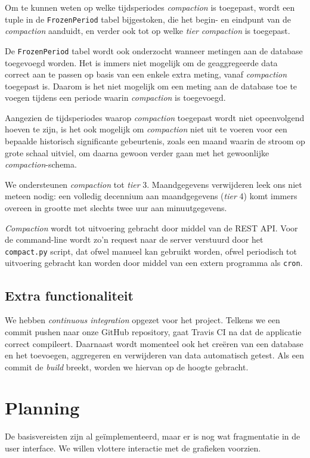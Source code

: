 \documentclass[12pt,parskip=full]{article}
\begin{document}
Om te kunnen weten op welke tijdsperiodes \emph{compaction} is toegepast, wordt een tuple in de \texttt{FrozenPeriod} tabel bijgestoken, die het begin- en eindpunt van de \emph{compaction} aanduidt, en verder ook tot op welke \emph{tier} \emph{compaction} is toegepast. 

De \texttt{FrozenPeriod} tabel wordt ook onderzocht wanneer metingen aan de database toegevoegd worden. Het is immers niet mogelijk om de geaggregeerde data correct aan te passen op basis van een enkele extra meting, vanaf \emph{compaction} toegepast is. Daarom is het niet mogelijk om een meting aan de database toe te voegen tijdens een periode waarin \emph{compaction} is toegevoegd.

Aangezien de tijdsperiodes waarop \emph{compaction} toegepast wordt niet opeenvolgend hoeven te zijn, is het ook mogelijk om \emph{compaction} niet uit te voeren voor een bepaalde historisch significante gebeurtenis, zoals een maand waarin de stroom op grote schaal uitviel, om daarna gewoon verder gaan met het gewoonlijke \emph{compaction}-schema.

We ondersteunen \emph{compaction} tot \emph{tier} 3. Maandgegevens verwijderen leek ons niet meteen nodig: een volledig decennium aan maandgegevens (\emph{tier} 4) komt immers overeen in grootte met slechts twee uur aan minuutgegevens.

\emph{Compaction} wordt tot uitvoering gebracht door middel van de REST API. Voor de command-line wordt zo'n request naar de server verstuurd door het \texttt{compact.py} script, dat ofwel manueel kan gebruikt worden, ofwel periodisch tot uitvoering gebracht kan worden door middel van een extern programma als \texttt{cron}.

\subsection{Extra functionaliteit}

We hebben
\emph{continuous integration} opgezet voor het project. Telkens we een {commit} 
pushen naar onze GitHub {repository}, gaat Travis CI na dat de applicatie 
correct compileert. Daarnaast wordt 
momenteel ook het cre\"eren van een database en het toevoegen, aggregeren en 
verwijderen van data automatisch getest. Als een commit de \textit{build} 
breekt, worden we hiervan op de hoogte gebracht.

\section{Planning}
De basisvereisten zijn al ge\"implementeerd, maar er is nog wat fragmentatie in
de user interface. We willen vlottere interactie met de grafieken voorzien.
\end{document}
